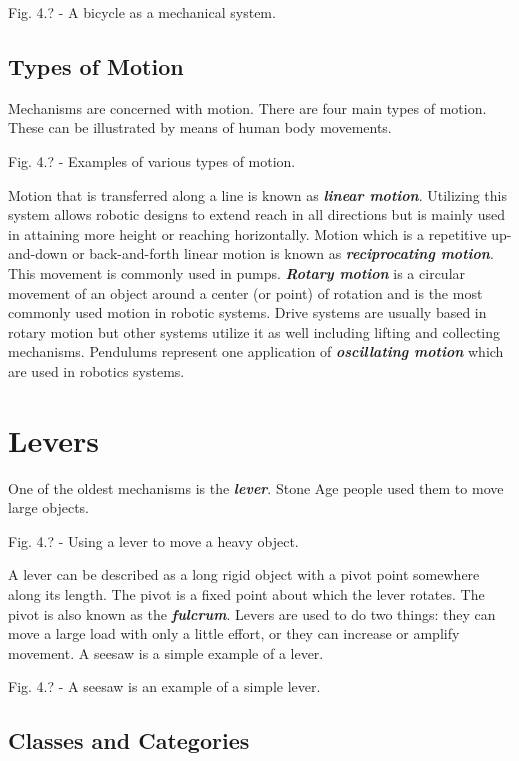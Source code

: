 \documentclass[
]{book}
\begin{document}
Fig. 4.? - A bicycle as a mechanical system.

\hypertarget{types-of-motion}{%
\subsection{Types of Motion}\label{types-of-motion}}

Mechanisms are concerned with motion. There are four main types of motion. These can be illustrated by means of human body movements.

Fig. 4.? - Examples of various types of motion.

Motion that is transferred along a line is known as \textbf{\emph{linear motion}}. Utilizing this system allows robotic designs to extend reach in all directions but is mainly used in attaining more height or reaching horizontally. Motion which is a repetitive up-and-down or back-and-forth linear motion is known as \textbf{\emph{reciprocating motion}}. This movement is commonly used in pumps. \textbf{\emph{Rotary motion}} is a circular movement of an object around a center (or point) of rotation and is the most commonly used motion in robotic systems. Drive systems are usually based in rotary motion but other systems utilize it as well including lifting and collecting mechanisms. Pendulums represent one application of \textbf{\emph{oscillating motion}} which are used in robotics systems.

\hypertarget{levers}{%
\section{Levers}\label{levers}}

One of the oldest mechanisms is the \textbf{\emph{lever}}. Stone Age people used them to move large objects.

Fig. 4.? - Using a lever to move a heavy object.

A lever can be described as a long rigid object with a pivot point somewhere along its length. The pivot is a fixed point about which the lever rotates. The pivot is also known as the \textbf{\emph{fulcrum}}. Levers are used to do two things: they can move a large load with only a little effort, or they can increase or amplify movement. A seesaw is a simple example of a lever.

Fig. 4.? - A seesaw is an example of a simple lever.

\hypertarget{classes-and-categories}{%
\subsection{Classes and Categories}\label{classes-and-categories}}
\end{document}
